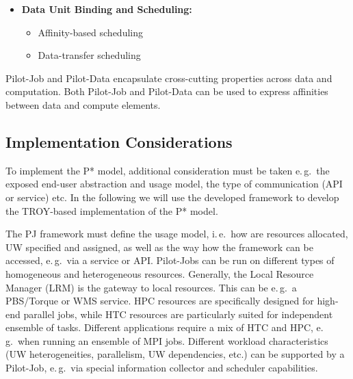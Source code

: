 \documentclass[conference,final]{IEEEtran}
\begin{document}
\begin{itemize}
    \item \textbf{Data Unit Binding and Scheduling:}
    \begin{itemize}
        \item Affinity-based scheduling
        \item Data-transfer scheduling
    \end{itemize}    
\end{itemize}

Pilot-Job and Pilot-Data encapsulate cross-cutting properties across data and 
computation. Both Pilot-Job and Pilot-Data can be used to express affinities 
between data and compute elements. 



\subsection{Implementation Considerations}

To implement the P* model, additional consideration must be taken e.\,g.\ the 
exposed end-user abstraction and usage model, the type of communication (API or 
service) etc. In the following we will use the developed framework to develop 
the TROY-based implementation of the P* model. 

The PJ framework must define the usage model, i.\,e.\ how are resources
allocated, UW specified and assigned, as well as the way how the framework can
be accessed, e.\,g.\ via a service or API. Pilot-Jobs can be run on different
types of homogeneous and heterogeneous resources. Generally, the Local Resource
Manager (LRM) is the gateway to local resources. This can be e.\,g.\ a
PBS/Torque or WMS service. HPC resources are specifically designed for high-end
parallel jobs, while HTC resources are particularly suited for 
independent ensemble of tasks. Different applications require a mix of HTC and
HPC, e.\,g.\ when running an ensemble of MPI jobs. 
Different workload characteristics (UW heterogeneities, parallelism, UW dependencies, etc.) can be supported by a Pilot-Job, e.\,g.\ via special information collector and scheduler capabilities.
\end{document}
